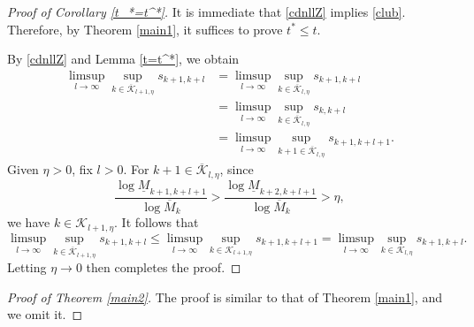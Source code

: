 \documentclass[12pt]{amsart}
\numberwithin{equation}{section}
\theoremstyle{plain}
\theoremstyle{remark}
\theoremstyle{definition}
\newcommand{\ok}{\overline{\mathcal{K}}}
\newcommand{\kk}{\mathcal{K}}
\newcommand{\om}{\overline{M}}
\newcommand{\um}{\underline{M}}
\newcommand{\f}{\frac}
\renewcommand{\le}{\leqslant}
\begin{document}
\begin{proof}[Proof of Corollary \ref{t_*=t^*}]
	It is immediate that \eqref{cdnllZ} implies \eqref{club}. 
	Therefore, by Theorem \ref{main1}, it suffices to prove $t^*\le t$.
	
 By \eqref{cdnllZ} and Lemma \ref{t=t^*},   we obtain
\begin{align*}
	\limsup_{l\to \infty}\sup_{k\in \ok_{l+1,\eta}}s_{k+1,k+l}&=\limsup_{l\to \infty}\sup_{k\in \ok_{l,\eta}}s_{k+1,k+l}\\
	&=\limsup_{l\to \infty}\sup_{k\in \ok_{l,\eta}}s_{k,k+l}\\
	&=\limsup_{l\to \infty}\sup_{k+1\in \ok_{l,\eta}}s_{k+1,k+l+1}.
\end{align*}
Given $\eta>0$, fix $l>0$. For $k+1\in \ok_{l,\eta}$, since
\[
\f{\log \um_{k+1,k+l+1}}{\log \om_k}>	\f{\log \um_{k+2,k+l+1}}{\log \om_k}>\eta,
\]
we have  $k\in \kk_{l+1,\eta}$. It follows that
\[
\limsup_{l\to \infty}\sup_{k\in \ok_{l+1,\eta}}s_{k+1,k+l}	\le \limsup_{l\to \infty}\sup_{k\in \kk_{l+1,\eta}}s_{k+1,k+l+1}
=\limsup_{l\to \infty}\sup_{k\in \kk_{l,\eta}}s_{k+1,k+l}.
\]
Letting $\eta\to 0$ then completes the proof.
\end{proof}
	
	\begin{proof}[Proof of Theorem \ref{main2}]
		The proof is similar to that of Theorem \ref{main1}, and we omit it.
	\end{proof}
	
	
	

	
\end{document}
